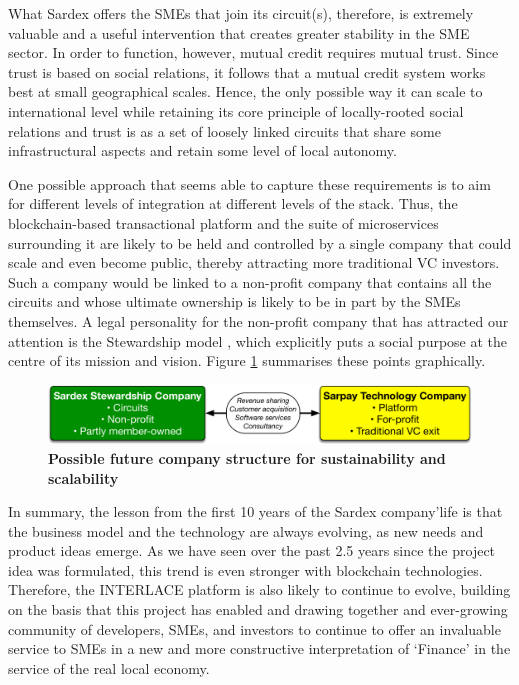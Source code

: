 What Sardex offers the SMEs that join its circuit(s), therefore, is extremely valuable and a useful intervention that creates greater stability in the SME sector. In order to function, however, mutual credit requires mutual trust. Since trust is based on social relations, it follows that a mutual credit system works best at small geographical scales. Hence, the only possible way it can scale to international level while retaining its core principle of locally-rooted social relations and trust is as a set of loosely linked circuits that share some infrastructural aspects and retain some level of local autonomy.

One possible approach that seems able to capture these requirements is to aim for different levels of integration at different levels of the stack. Thus, the blockchain-based transactional platform and the suite of microservices surrounding it are likely to be held and controlled by a single company that could scale and even become public, thereby attracting more traditional VC investors. Such a company would be linked to a non-profit company that contains all the circuits and whose ultimate ownership is likely to be in part by the SMEs themselves. A legal personality for the non-profit company that has attracted our attention is the Stewardship model \cite{Karns2011}, which explicitly puts a social purpose at the centre of its mission and vision. Figure \ref{fig:structure} summarises these points graphically.

\begin{figure}[h]
\centering
\includegraphics[width=16 cm]{Figures/structure}
\caption{\bf \small Possible future company structure for sustainability and scalability}
\label{fig:structure}
\end{figure}

In summary, the lesson from the first 10 years of the Sardex company'life is that the business model and the technology are always evolving, as new needs and product ideas emerge. As we have seen over the past 2.5 years since the project idea was formulated, this trend is even stronger with blockchain technologies. Therefore, the INTERLACE platform is also likely to continue to evolve, building on the basis that this project has enabled and drawing together and ever-growing community of developers, SMEs, and investors to continue to offer an invaluable service to SMEs in a new and more constructive interpretation of `Finance' in the service of the real local economy.




















